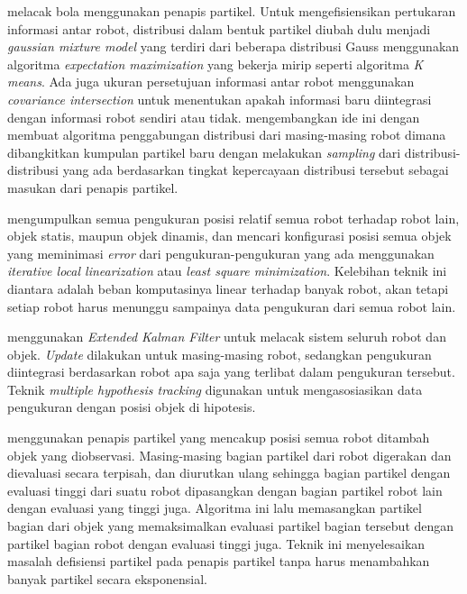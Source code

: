 \citet{santos2009} melacak bola menggunakan penapis partikel. Untuk mengefisiensikan pertukaran informasi antar robot, distribusi dalam bentuk partikel diubah dulu menjadi \textit{gaussian mixture model} yang terdiri dari beberapa distribusi Gauss menggunakan algoritma \textit{expectation maximization} yang bekerja mirip seperti algoritma \textit{K means}. Ada juga ukuran persetujuan informasi antar robot menggunakan \textit{covariance intersection} untuk menentukan apakah informasi baru diintegrasi dengan informasi robot sendiri atau tidak. \citet{ahmad2011} mengembangkan ide ini dengan membuat algoritma penggabungan distribusi dari masing-masing robot dimana dibangkitkan kumpulan partikel baru dengan melakukan \textit{sampling} dari distribusi-distribusi yang ada berdasarkan tingkat kepercayaan distribusi tersebut sebagai masukan dari penapis partikel.

\citet{ahmad2013} mengumpulkan semua pengukuran posisi relatif semua robot terhadap robot lain, objek statis, maupun objek dinamis, dan mencari konfigurasi posisi semua objek yang meminimasi \textit{error} dari pengukuran-pengukuran yang ada menggunakan \textit{iterative local linearization} atau \textit{least square minimization}. Kelebihan teknik ini diantara adalah beban komputasinya linear terhadap banyak robot, akan tetapi setiap robot harus menunggu sampainya data pengukuran dari semua robot lain.

\citet{chang2016} menggunakan \textit{Extended Kalman Filter} untuk melacak sistem seluruh robot dan objek. \textit{Update} dilakukan untuk masing-masing robot, sedangkan pengukuran diintegrasi berdasarkan robot apa saja yang terlibat dalam pengukuran tersebut. Teknik \textit{multiple hypothesis tracking} digunakan untuk mengasosiasikan data pengukuran dengan posisi objek di hipotesis.

\citet{ahmad2017} menggunakan penapis partikel yang mencakup posisi semua robot ditambah objek yang diobservasi. Masing-masing bagian partikel dari robot digerakan dan dievaluasi secara terpisah, dan diurutkan ulang sehingga bagian partikel dengan evaluasi tinggi dari suatu robot dipasangkan dengan bagian partikel robot lain dengan evaluasi yang tinggi juga. Algoritma ini lalu memasangkan partikel bagian dari objek yang memaksimalkan evaluasi partikel bagian tersebut dengan partikel bagian robot dengan evaluasi tinggi juga. Teknik ini menyelesaikan masalah defisiensi partikel pada penapis partikel tanpa harus menambahkan banyak partikel secara eksponensial.

